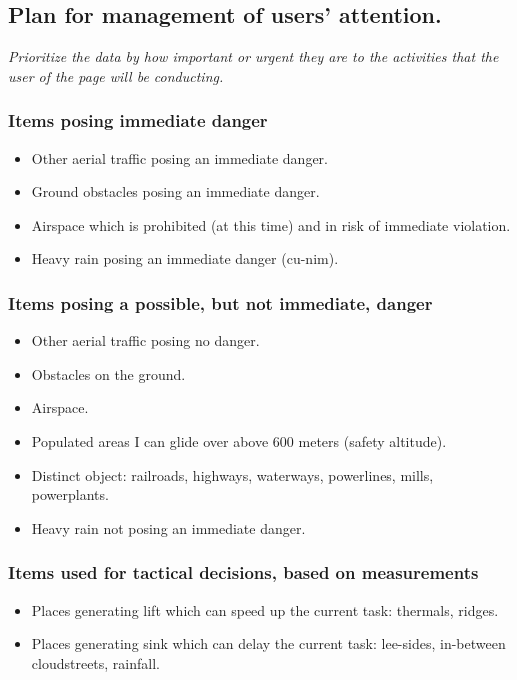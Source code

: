 \documentclass{article}
\newcommand{\myquote}[1]
{
	\textit{#1}
}
\begin{document}
\subsection{Plan for management of users' attention.}
\myquote{Prioritize the data by how important or urgent they are to the activities that the user of the page will be conducting.}

\subsubsection{Items posing immediate danger}
\begin{itemize}
\item Other aerial traffic posing an immediate danger.
\item Ground obstacles posing an immediate danger.
\item Airspace which is prohibited (at this time) and in risk of immediate violation.
\item Heavy rain posing an immediate danger (cu-nim).
\end{itemize}

\subsubsection{Items posing a possible, but not immediate, danger}
\begin{itemize}
\item Other aerial traffic posing no danger.
\item Obstacles on the ground.
\item Airspace.
\item Populated areas I can glide over above 600 meters (safety altitude).
\item Distinct object: railroads, highways, waterways, powerlines, mills, powerplants.
\item Heavy rain not posing an immediate danger.
\end{itemize}

\subsubsection{Items used for tactical decisions, based on measurements}
\begin{itemize}
\item Places generating lift which can speed up the current task: thermals, ridges.
\item Places generating sink which can delay the current task: lee-sides, in-between cloudstreets, rainfall.
\end{itemize}
\end{document}

